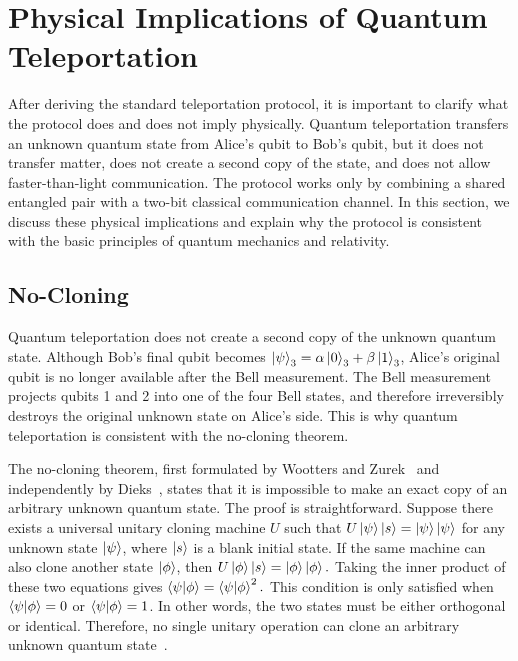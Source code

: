 \documentclass[aps,prd,preprint,floats,epsf,superscriptaddress,nofootinbib]{revtex4}
\begin{document}
\newpage
\section{Physical Implications of Quantum Teleportation}
\label{sec:Physical meaning}
After deriving the standard teleportation protocol, it is important to clarify what the protocol does and does not imply physically. Quantum teleportation transfers an unknown quantum state from Alice's qubit to Bob's qubit, but it does not transfer matter, does not create a second copy of the state, and does not allow faster-than-light communication. The protocol works only by combining a shared entangled pair with a two-bit classical communication channel. In this section, we discuss these physical implications and explain why the protocol is consistent with the basic principles of quantum mechanics and relativity.
\subsection{No-Cloning}
Quantum teleportation does not create a second copy of the unknown quantum state. Although Bob's final qubit becomes $\ket{\psi}_3 = \alpha\ket{0}_3 + \beta\ket{1}_3$, Alice's original qubit is no longer available after the Bell measurement. The Bell measurement projects qubits 1 and 2 into one of the four Bell 
states, and therefore irreversibly destroys the original unknown state 
on Alice's side. This is why quantum teleportation is consistent with the no-cloning 
theorem. 

The no-cloning theorem, first formulated by Wootters and 
Zurek~\cite{Wootters1982} and independently by Dieks~\cite{Dieks1982}, 
states that it is impossible to make an exact copy of an arbitrary 
unknown quantum state. The proof is straightforward. Suppose there 
exists a universal unitary cloning machine $U$ such that
$U\ket{\psi}\ket{s} = \ket{\psi}\ket{\psi}$ for any unknown state $\ket{\psi}$, where $\ket{s}$ is a blank initial 
state. If the same machine can also clone another state $\ket{\phi}$, 
then $U\ket{\phi}\ket{s} = \ket{\phi}\ket{\phi}.$
Taking the inner product of these two equations gives
$\braket{\psi|\phi} = \braket{\psi|\phi}^{2}.$
This condition is only satisfied when $\braket{\psi|\phi}=0$ or 
$\braket{\psi|\phi}=1$. In other words, the two states must be either 
orthogonal or identical. Therefore, no single unitary operation can 
clone an arbitrary unknown quantum state~\cite{NielsenChuang2000}.
\end{document}
